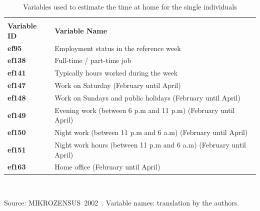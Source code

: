 \documentclass[11pt]{IJM-article}
\begin{document}
\begin{table}[htb] 
    \centering
    \caption{Variables used to estimate the time at home for the single 
    individuals}\label{tab:4} 
    \begin{tabular}{l l}
        \addlinespace \toprule
        \multicolumn{2}{l}{\textbf{Labor participation}}\\ 
        \textbf{Variable ID} & \textbf{Variable Name} \\
        \textbf{ef95} & Employment status in the reference week\\ 
        \textbf{ef138} & Full-time / part-time job\\ 
        \textbf{ef141} & Typically hours worked during the week\\
        \textbf{ef147} & Work on Saturday (February until April)\\ 
        \textbf{ef148} & Work on Sundays and public holidays (February until 
            April)\\
        \textbf{ef149}& Evening work (between 6 p.m and 11 p.m) (February until
            April)\\ 
        \textbf{ef150} & Night work (between 11 p.m and 6 a.m) (February until 
            April)\\ 
        \textbf{ef151} & Night work hours (between 11 p.m and 6 a.m) (February
            until April)\\ 
        \textbf{ef163} & Home office (February until April)\\ \bottomrule 
    \end{tabular}\\ 
    \begin{flushright}
        \begin{footnotesize} Source:
            MIKROZENSUS~2002~\cite{StatistischesBundesamt.2002}. 
            Variable names: translation by the authors.\\ 
        \end{footnotesize} 
    \end{flushright}
\end{table}
\end{document}
